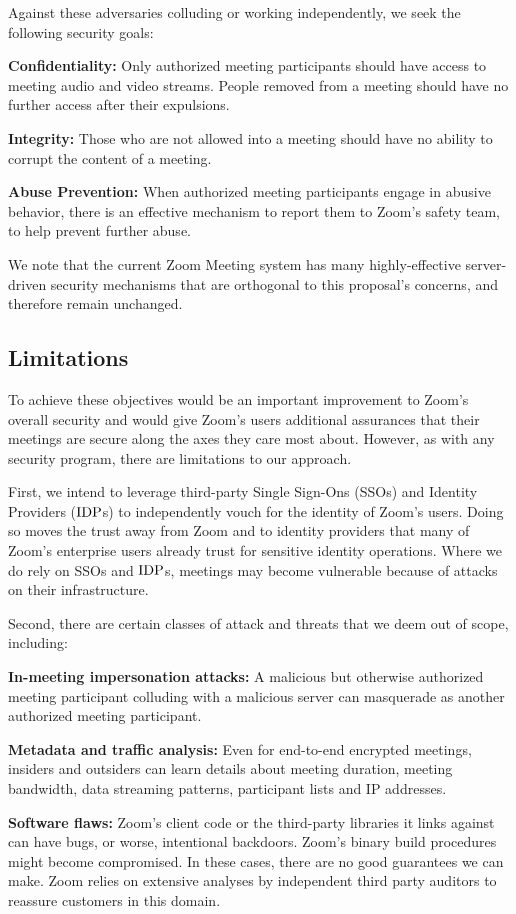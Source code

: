 Against these adversaries colluding or working independently, we seek the following security goals:

\begin{description}
	\item {\bf Confidentiality:} Only authorized meeting participants should have access to meeting audio and video streams. People removed from a meeting should have no further access after their expulsions.
	\item {\bf Integrity:} Those who are not allowed into a meeting should have no ability to corrupt the content of a meeting.
	\item {\bf Abuse Prevention:} When authorized meeting participants engage in abusive behavior, there is an effective mechanism to report them to Zoom's safety team, to help prevent further abuse.
\end{description}

We note that the current Zoom Meeting system has many highly-effective server-driven security mechanisms that are orthogonal to this proposal's concerns, and therefore remain unchanged.

\subsection{Limitations}
\label{subsec:limit}
To achieve these objectives would be an important improvement to Zoom's overall security and would give Zoom's users additional assurances that their meetings are secure along the axes they care most about. However, as with any security program, there are limitations to our approach.

First, we intend to leverage third-party Single Sign-Ons (SSOs) and Identity Providers ($\mathrm{IDP}$s) to independently vouch for the identity of Zoom's users. Doing so moves the trust away from Zoom and to identity providers that many of Zoom's enterprise users already trust for sensitive identity operations. Where we do rely on SSOs and $\mathrm{IDP}$s, meetings may become vulnerable because of attacks on their infrastructure.

Second, there are certain classes of attack and threats that we deem out of scope, including:

\begin{description}
	\item {\bf In-meeting impersonation attacks:} A malicious but otherwise authorized meeting participant colluding with a malicious server can masquerade as another authorized meeting participant.
	\item {\bf Metadata and traffic analysis:} Even for end-to-end encrypted meetings, insiders and outsiders can learn details about meeting duration, meeting bandwidth, data streaming patterns, participant lists and IP addresses.
	\item {\bf Software flaws:} Zoom's client code or the third-party libraries it links against can have bugs, or worse, intentional backdoors. Zoom's binary build procedures might become compromised. In these cases, there are no good guarantees we can make. Zoom relies on extensive analyses by independent third party auditors to reassure customers in this domain.
\end{description}

